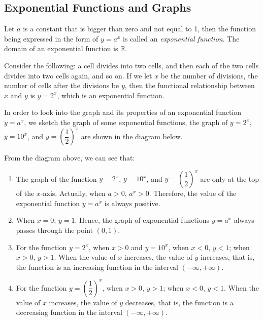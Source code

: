 \documentclass[12pt]{report}
\begin{document}
\subsection*{Exponential Functions and Graphs}

Let $a$ is a constant that is bigger than zero and not equal to 1, then the
function being expressed in the form of $y = a^x$ is called an
\emph{exponential function}. The domain of an exponential function is
$\mathbb{R}$.

Consider the following: a cell divides into two cells, and then each of the two
cells divides into two cells again, and so on. If we let $x$ be the number of
divisions, the number of cells after the divisions be $y$, then the functional
relationship between $x$ and $y$ is $y = 2^x$, which is an exponential
function.

In order to look into the graph and its properties of an exponential function
$y = a^x$, we sketch the graph of some exponential functions, the graph of $y =
  2^x$, $y = 10^x$, and $y = \left(\dfrac{1}{2}\right)^x$ are shown in the
diagram below.

From the diagram above, we can see that:
\begin{enumerate}[label=(\arabic*)]
  \item The graph of the function $y = 2^x$, $y = 10^x$, and $y =
          \left(\dfrac{1}{2}\right)^x$ are only at the top of the $x$-axis. Actually,
        when $a > 0$, $a^x > 0$. Therefore, the value of the exponential function $y =
          a^x$ is always positive.

  \item When $x = 0$, $y = 1$. Hence, the graph of exponential functions $y = a^x$
        always passes through the point $(0, 1)$.

  \item For the function $y = 2^x$, when $x > 0$ and $y = 10^x$, when $x < 0$, $y < 1$;
        when $x > 0$, $y > 1$. When the value of $x$ increases, the value of $y$
        increases, that is, the function is an increasing function in the interval
        $(-\infty, +\infty)$.

  \item For the function $y = \left(\dfrac{1}{2}\right)^x$, when $x > 0$, $y > 1$; when
        $x < 0$, $y < 1$. When the value of $x$ increases, the value of $y$ decreases,
        that is, the function is a decreasing function in the interval $(-\infty,
          +\infty)$.
\end{enumerate}
\end{document}
